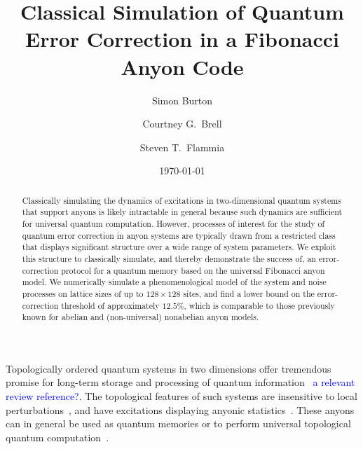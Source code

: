 \documentclass[aps, prl, letterpaper, twocolumn, superscriptaddress, notitlepage, 10pt]{revtex4-1}
\newcommand{\cggb}[1]{\textcolor{blue}{#1}}
\begin{document}
\title{Classical Simulation of Quantum Error Correction in a Fibonacci Anyon Code}

\author{Simon Burton}
\author{Courtney G.\ Brell}
\author{Steven T.\ Flammia}

\date{\today}

\begin{abstract}
Classically simulating the dynamics of excitations in two-dimensional quantum systems that 
support anyons is likely intractable in general because such dynamics are sufficient for 
universal quantum computation. However, processes of interest for the study of quantum error correction in anyon systems are typically drawn from a restricted class that displays significant structure over a wide range of system parameters.
We exploit this structure to classically simulate, and thereby demonstrate the success of, an error-correction protocol for a quantum memory based on the universal Fibonacci anyon model.  We numerically simulate a phenomenological model of the system and noise processes on lattice sizes of up to 
$128\times128$ sites, and find a lower bound on the error-correction threshold of 
approximately $12.5\%$, which is comparable to those previously known for abelian and 
(non-universal) nonabelian anyon models.
\end{abstract}

\maketitle


Topologically ordered quantum systems in two dimensions offer tremendous promise for long-term storage and processing of quantum 
information~\cite{Dennis2002} \cggb{a relevant review reference?}. The topological features of such systems are insensitive to local perturbations~\cite{Bravyi2010, Bravyi2011a, Michalakis2013}, and have excitations displaying anyonic statistics~\cite{Wilczek1990}. These anyons can in general be used as quantum memories or to perform universal topological quantum computation~\cite{Kitaev2003, Freedman2002, Nayak2008}.
\end{document}
